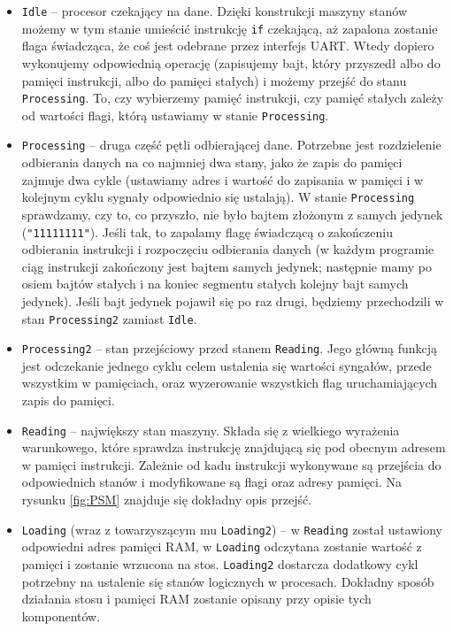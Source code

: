 \begin{itemize}
  \item \texttt{Idle} -- procesor czekający na dane. Dzięki konstrukcji maszyny stanów możemy w tym stanie umieścić instrukcję \texttt{if} czekającą, aż zapalona zostanie flaga świadcząca, że coś jest odebrane przez interfejs UART. Wtedy dopiero wykonujemy odpowiednią operację (zapisujemy bajt, który przyszedł albo do pamięci instrukcji, albo do pamięci stałych) i możemy przejść do stanu \texttt{Processing}. To, czy wybierzemy pamięć instrukcji, czy pamięć stałych zależy od wartości flagi, którą ustawiamy w stanie \texttt{Processing}.
  \item \texttt{Processing} -- druga część pętli odbierającej dane. Potrzebne jest rozdzielenie odbierania danych na co najmniej dwa stany, jako że zapis do pamięci zajmuje dwa cykle (ustawiamy adres i wartość do zapisania w pamięci i w kolejnym cyklu sygnały odpowiednio się ustalają). W stanie \texttt{Processing} sprawdzamy, czy to, co przyszło, nie było bajtem złożonym z samych jedynek (\texttt{"11111111"}). Jeśli tak, to zapalamy flagę świadczącą o zakończeniu odbierania instrukcji i rozpoczęciu odbierania danych (w każdym programie ciąg instrukcji zakończony jest bajtem samych jedynek; następnie mamy po osiem bajtów stałych i na koniec segmentu stałych kolejny bajt samych jedynek). Jeśli bajt jedynek pojawił się po raz drugi, będziemy przechodzili w stan \texttt{Processing2} zamiast \texttt{Idle}.
  \item \texttt{Processing2} -- stan przejściowy przed stanem \texttt{Reading}. Jego główną funkcją jest odczekanie jednego cyklu celem ustalenia się wartości syngałów, przede wszystkim w pamięciach, oraz wyzerowanie wszystkich flag uruchamiających zapis do pamięci.
  \item \texttt{Reading} -- największy stan maszyny. Składa się z wielkiego wyrażenia warunkowego, które sprawdza instrukcję znajdującą się pod obecnym adresem w pamięci instrukcji. Zależnie od kadu instrukcji wykonywane są przejścia do odpowiednich stanów i modyfikowane są flagi oraz adresy pamięci. Na rysunku \ref{fig:PSM} znajduje się dokładny opis przejść.
  \item \texttt{Loading} (wraz z towarzyszącym mu \texttt{Loading2}) -- w \texttt{Reading} został ustawiony odpowiedni adres pamięci RAM, w \texttt{Loading} odczytana zostanie wartość z pamięci i zostanie wrzucona na stos. \texttt{Loading2} dostarcza dodatkowy cykl potrzebny na ustalenie się stanów logicznych w procesach. Dokładny sposób działania stosu i pamięci RAM zostanie opisany przy opisie tych komponentów.

\end{itemize}
